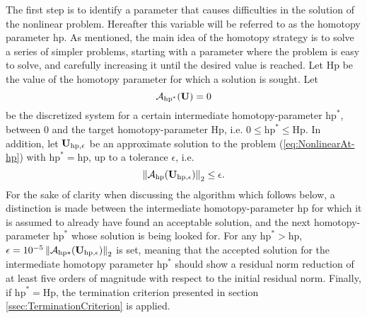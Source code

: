 The first step is to identify a parameter that causes difficulties in the solution of the nonlinear problem. Hereafter this variable will be referred to as the homotopy parameter $\mathrm{hp}$. 
As mentioned, the main idea of the homotopy strategy is to solve a series of simpler problems, starting with a parameter where the problem is easy to solve, and carefully increasing it until the desired value is reached.  Let  $\mathrm{Hp}$ be the value of the homotopy parameter for which a solution is sought. Let
\begin{equation}
	\mathcal{A}_{\mathrm{hp}^*}(\textbf{U}) = 0
	\label{eq:NonlinearAt-hp}
\end{equation}
be the discretized system for a certain intermediate homotopy-parameter $\mathrm{hp}^*$, between 0 and the target homotopy-parameter $\mathrm{Hp}$, i.e. $0 \leq \mathrm{hp}^* \leq \mathrm{Hp}$.
In addition, let $\textbf{U}_{\mathrm{hp},\epsilon} $ be an approximate solution to the problem (\ref{eq:NonlinearAt-hp}) with $ \mathrm{hp}^* =  \mathrm{hp}$,
up to a tolerance $\epsilon$, i.e. 
\begin{equation}
	\left\| \mathcal{A}_{\mathrm{hp}}( \textbf{U}_{\mathrm{hp},\epsilon} ) \right\|_2 \leq \epsilon .
\end{equation}
For the sake of clarity when discussing the algorithm which follows below, a distinction is made between the intermediate homotopy-parameter $\mathrm{hp}$ for which it is assumed to already have found an acceptable solution, and the next homotopy-parameter $\mathrm{hp}^*$ whose solution is being looked for.
For any $\textrm{hp}^* > \textrm{hp}$, $\epsilon= 10^{-5} \left\| \mathcal{A}_{\mathrm{hp*}}( \textbf{U}_{\mathrm{hp},\epsilon} ) \right\|_2$ is set,
meaning that the accepted solution for the intermediate homotopy parameter $\mathrm{hp}^*$ should show a residual norm reduction of at least five orders of magnitude with respect to the initial residual norm.
Finally, if $\textrm{hp}^* = \textrm{Hp}$, the termination criterion presented in section \ref{ssec:TerminationCriterion} is applied.%
\tikzexternaldisable

